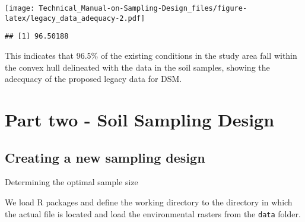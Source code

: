 \documentclass[
]{book}
\newenvironment{Shaded}{\begin{snugshade}}{\end{snugshade}}
\newcommand{\AttributeTok}[1]{\textcolor[rgb]{0.77,0.63,0.00}{#1}}
\newcommand{\CommentTok}[1]{\textcolor[rgb]{0.56,0.35,0.01}{\textit{#1}}}
\newcommand{\ConstantTok}[1]{\textcolor[rgb]{0.00,0.00,0.00}{#1}}
\newcommand{\DecValTok}[1]{\textcolor[rgb]{0.00,0.00,0.81}{#1}}
\newcommand{\FunctionTok}[1]{\textcolor[rgb]{0.00,0.00,0.00}{#1}}
\newcommand{\NormalTok}[1]{#1}
\newcommand{\OtherTok}[1]{\textcolor[rgb]{0.56,0.35,0.01}{#1}}
\newcommand{\SpecialCharTok}[1]{\textcolor[rgb]{0.00,0.00,0.00}{#1}}
\newcommand{\StringTok}[1]{\textcolor[rgb]{0.31,0.60,0.02}{#1}}
\begin{document}
\texttt{[image: Technical\_Manual-on-Sampling-Design\_files/figure-latex/legacy\_data\_adequacy-2.pdf]}

\begin{Shaded}
\end{Shaded}

\begin{verbatim}
## [1] 96.50188
\end{verbatim}

This indicates that 96.5\% of the existing conditions in the study area fall within the convex hull delineated with the data in the soil samples, showing the adecquacy of the proposed legacy data for DSM.

\hypertarget{part-part-two---soil-sampling-design}{%
\part{Part two - Soil Sampling Design}\label{part-part-two---soil-sampling-design}}

\hypertarget{creating-a-new-sampling-design}{%
\chapter{Creating a new sampling design}\label{creating-a-new-sampling-design}}

Determining the optimal sample size

We load R packages and define the working directory to the directory in which the actual file is located and load the environmental rasters from the \texttt{data} folder.

\begin{Shaded}
\end{Shaded}
\end{document}
